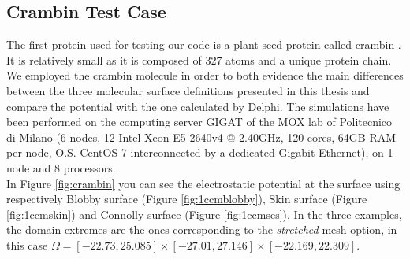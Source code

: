 \documentclass[11pt,a4paper]{article}
\begin{document}
\subsection{Crambin Test Case}
\label{sec:crambin}
The first protein used for testing our code is a plant seed protein called crambin \cite{1ccm, 1ccm2}. It is relatively small as it is composed of 327 atoms and a unique protein chain. We employed the crambin molecule in order to both evidence the main differences between the three molecular surface definitions presented in this thesis and compare the potential with the one calculated by Delphi. The simulations have been performed on the computing server GIGAT of the MOX lab of Politecnico di Milano (6 nodes, 12 Intel Xeon E5-2640v4 @ 2.40GHz, 120 cores, 64GB RAM per node, O.S. CentOS 7 interconnected by a dedicated Gigabit Ethernet), on 1 node and 8 processors. \\
In Figure \ref{fig:crambin} you can see the electrostatic potential at the surface using respectively Blobby surface (Figure \ref{fig:1ccmblobby}), Skin surface (Figure \ref{fig:1ccmskin}) and Connolly surface (Figure \ref{fig:1ccmses}). In the three examples, the domain extremes are the ones corresponding to the \emph{stretched} mesh option, in this case $\Omega = [-22.73, 25.085] \times [-27.01, 27.146] \times [-22.169, 22.309]$.
\end{document}
